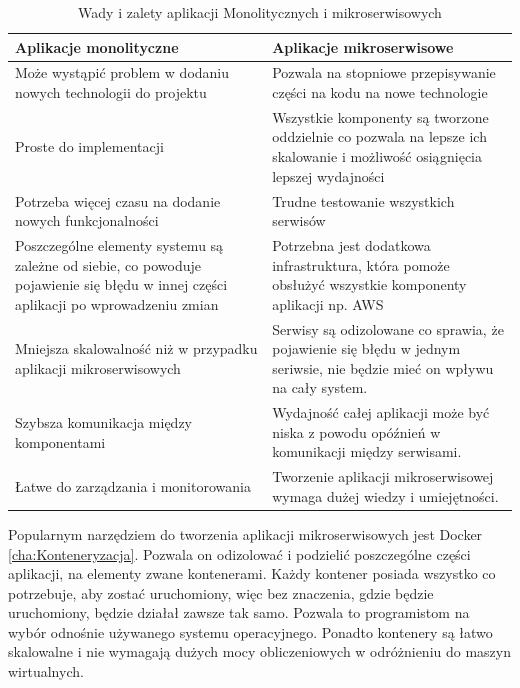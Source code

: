 \documentclass{iiuwb}
\begin{document}
\begin{table}[!h]
\caption{Wady i zalety aplikacji Monolitycznych i mikroserwisowych}
\begin{center}
\begin{tabular}{| p{5cm} | p{5cm} |}
\hline
Aplikacje monolityczne  & Aplikacje mikroserwisowe\\
\hline
\hline
Może wystąpić problem w dodaniu nowych technologii do projektu & Pozwala na stopniowe przepisywanie części na kodu na nowe technologie   \\ \hline
Proste do implementacji & Wszystkie komponenty są tworzone oddzielnie co pozwala na lepsze ich skalowanie i możliwość osiągnięcia lepszej wydajności \\ \hline
Potrzeba więcej czasu na dodanie nowych funkcjonalności & Trudne testowanie wszystkich serwisów \\ \hline
Poszczególne elementy systemu są zależne od siebie, co powoduje pojawienie się błędu w innej części aplikacji po wprowadzeniu zmian & Potrzebna jest dodatkowa infrastruktura, która pomoże obsłużyć wszystkie komponenty aplikacji np. AWS \\ \hline
Mniejsza skalowalność niż w przypadku aplikacji mikroserwisowych & Serwisy są odizolowane co sprawia, że pojawienie się błędu w jednym seriwsie, nie będzie mieć on wpływu na cały system. \\ \hline
Szybsza komunikacja między komponentami & Wydajność całej aplikacji może być niska z powodu opóźnień w komunikacji między serwisami. \\ \hline
Łatwe do zarządzania i monitorowania  & Tworzenie aplikacji mikroserwisowej wymaga dużej wiedzy i umiejętności. \\ \hline
\end{tabular}
\label{tab:Wady i zalety aplikacji Monolitycznych i mikroserwisowych}
\end{center}
\end{table}

Popularnym narzędziem do tworzenia aplikacji mikroserwisowych jest Docker \ref{cha:Konteneryzacja}. Pozwala on odizolować i podzielić poszczególne części aplikacji, na elementy zwane kontenerami. Każdy kontener posiada wszystko co potrzebuje, aby zostać uruchomiony, więc  bez znaczenia, gdzie będzie uruchomiony, będzie działał zawsze tak samo. Pozwala to programistom na wybór odnośnie używanego systemu operacyjnego. Ponadto kontenery są łatwo skalowalne i nie wymagają dużych mocy obliczeniowych w odróżnieniu do maszyn wirtualnych.
\end{document}
